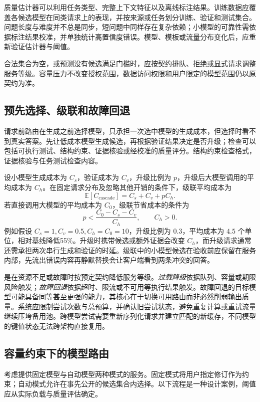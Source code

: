 \documentclass[../textbook.tex]{subfiles}
\begin{document}
质量估计器可以利用任务类型、完整上下文特征以及离线标注结果。训练数据应覆盖各候选模型在同类请求上的表现，并按来源或任务划分训练、验证和测试集合。问题长度与难度并不总是同步，短问题中同样存在复杂依赖；小模型的可靠性需依据标注结果校准，并单独统计高置信度错误。模型、模板或流量分布变化后，应重新验证估计器与阈值。

合法集合为空，或预测没有候选满足门槛时，应按契约排队、拒绝或显式请求调整服务等级。容量压力不改变授权范围，数据访问权限和用户限定的模型范围仍以原契约为准。

\subsection{预先选择、级联和故障回退}
请求前路由在生成之前选择模型，只承担一次选中模型的生成成本，但选择时看不到真实答案。先让低成本模型生成候选，再根据验证结果决定是否升级；检查可以包括可执行测试、结构约束、证据核验或经校准的质量评分。结构约束检查格式，证据核验与任务测试检查内容。

设小模型生成成本为 $C_s$，验证成本为 $C_v$，升级比例为 $p$，升级后大模型调用的平均成本为 $C_h$。在固定请求分布及忽略其他开销的条件下，级联平均成本为
\begin{equation}
 \mathbb E[C_{\mathrm{cascade}}]=C_s+C_v+pC_h.
\end{equation}
若直接调用大模型的平均成本为 $C_0$，级联节省成本的条件为
\begin{equation}
 p<\frac{C_0-C_s-C_v}{C_h},\qquad C_h>0.
\end{equation}
例如假设 $C_s=1,C_v=0.5,C_h=C_0=10$，升级比例为 $0.3$，平均成本为 $4.5$ 个单位，相对基线降低\num{55}\%。升级时携带候选或额外证据会改变 $C_h$，而升级请求通常还需承担两次串行生成和验证的时延。级联中的小模型候选在验收前应保留在服务内部，先流出错误内容再静默替换会让客户端看到两条冲突的回答。

是在资源不足或故障时按预定契约降低服务等级。\emph{过载降级}依据队列、容量或期限风险触发；\emph{故障回退}依据超时、限流或不可用等执行结果触发。故障回退的目标模型可能具备同等甚至更强的能力，其核心在于切换可用路由而非必然削弱输出质量。系统应限制尝试次数与总预算，并确认旧尝试状态，避免重复计算或重试流量继续压垮备用池。跨模型尝试需要重新序列化请求并建立匹配的新缓存，不同模型的键值状态无法跨架构直接复用。

\subsection{容量约束下的模型路由}
考虑提供固定模型与自动模型两种模式的服务。固定模式将用户指定修订作为约束；自动模式允许在事先公开的候选集合内选择。以下流程是一种设计案例，阈值应从实际负载与质量评估确定。
\end{document}
